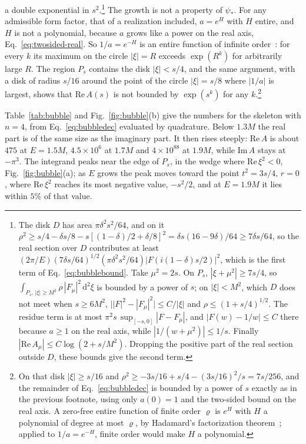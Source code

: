 \documentclass[aps,prd,10pt,twocolumn,superscriptaddress,nofootinbib,floatfix,longbibliography]{revtex4-2}
\newcommand{\dd}{\mathrm{d}}
\begin{document}
a double exponential in $s^2$.\footnote{The disk $D$ has area $\pi\delta^2s^2/64$, and on it $\rho^2\ge s/4-\delta s/8-s[(1-\delta)/2+\delta/8]^2=\delta s(16-9\delta)/64\ge7\delta s/64$, so the real section over $D$ contributes at least $(2\pi/E)(7\delta s/64)^{1/2}(\pi\delta^2s^2/64)|F(i(1-\delta)s/2)|^2$, which is the first term of Eq.~\eqref{eq:bubblebound}. Take $\mu^2=2s$. On $P_s$, $|\xi+\mu^2|\ge7s/4$, so $\int_{P_s,\,|\xi|\ge M^2}\rho\,|F_\mu|^2\,\dd^2\xi$ is bounded by a power of $s$; on $|\xi|<M^2$, which $D$ does not meet when $s\ge6M^2$, $\bigl||F|^2-|F_\mu|^2\bigr|\le C/|\xi|$ and $\rho\le(1+s/4)^{1/2}$. The residue term is at most $\pi^2s\,\sup_{[-s,0]}|F-F_\mu|$, and $|F(w)-1/w|\le C$ there because $a\ge1$ on the real axis, while $|1/(w+\mu^2)|\le1/s$. Finally $|\mathrm{Re}\,A_\mu|\le C\log(2+s/M^2)$. Dropping the positive part of the real section outside $D$, these bounds give the second term.} The growth is not a property of $\psi_*$. For any admissible form factor, that of a realization included, $a=e^{H}$ with $H$ entire, and $H$ is not a polynomial, because $a$ grows like a power on the real axis, Eq.~\eqref{eq:twosided-real}. So $1/a=e^{-H}$ is an entire function of infinite order~\cite{Titchmarsh1939}: for every $k$ its maximum on the circle $|\xi|=R$ exceeds $\exp(R^k)$ for arbitrarily large $R$. The region $P_s$ contains the disk $|\xi|<s/4$, and the same argument, with a disk of radius $s/16$ around the point of the circle $|\xi|=s/8$ where $|1/a|$ is largest, shows that $\mathrm{Re}\,A(s)$ is not bounded by $\exp(s^k)$ for any $k$.\footnote{On that disk $|\xi|\ge s/16$ and $\rho^2\ge-3s/16+s/4-(3s/16)^2/s=7s/256$, and the remainder of Eq.~\eqref{eq:bubbledec} is bounded by a power of $s$ exactly as in the previous footnote, using only $a(0)=1$ and the two-sided bound on the real axis. A zero-free entire function of finite order $\varrho$ is $e^{H}$ with $H$ a polynomial of degree at most $\varrho$, by Hadamard's factorization theorem~\cite{Titchmarsh1939}; applied to $1/a=e^{-H}$, finite order would make $H$ a polynomial.}

Table~\ref{tab:bubble} and Fig.~\ref{fig:bubble}(b) give the numbers for the skeleton with $n=4$, from Eq.~\eqref{eq:bubbledec} evaluated by quadrature. Below $1.3M$ the real part is of the same size as the imaginary part. It then rises steeply: $\mathrm{Re}\,A$ is about $475$ at $E=1.5M$, $4.5\times10^6$ at $1.7M$ and $4\times10^{88}$ at $1.9M$, while $\mathrm{Im}\,A$ stays at $-\pi^3$. The integrand peaks near the edge of $P_s$, in the wedge where $\mathrm{Re}\,\xi^2<0$, Fig.~\ref{fig:bubble}(a); as $E$ grows the peak moves toward the point $t^2=3s/4$, $r=0$, where $\mathrm{Re}\,\xi^2$ reaches its most negative value, $-s^2/2$, and at $E=1.9M$ it lies within $5\%$ of that value.
\end{document}
